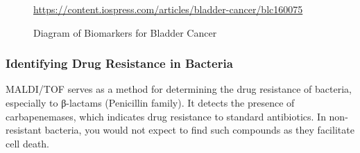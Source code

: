 \documentclass[letterpaper, 10 pt, conference]{ieeeconf}  %
\begin{document}
            \begin{figure}[h]
                \centering
            
                \caption{Diagram of Biomarkers for Bladder Cancer}

                \tiny{\url{https://content.iospress.com/articles/bladder-cancer/blc160075}}

            \end{figure}


            \subsubsection[\textbf{Identifying Drug Resistance in Bacteria}]{\textbf{Identifying Drug Resistance in Bacteria}\autocite{R12}}\hfill \hfill

            MALDI/TOF serves as a method for determining the drug resistance of bacteria, especially to β-lactams (Penicillin family). It detects the presence of carbapenemases, which indicates drug resistance to standard antibiotics. In non-resistant bacteria, you would not expect to find such compounds as they facilitate cell death.

\end{document}
